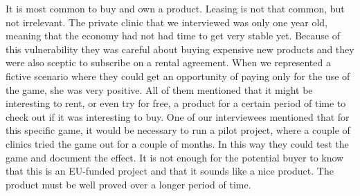 It is most common to buy and own a product. Leasing is not that common, but not irrelevant. The private clinic that we interviewed was only one year old, meaning that the economy had not had time to get very stable yet. Because of this vulnerability they was careful about buying expensive new products and they were also sceptic to subscribe on a rental agreement. When we represented a fictive scenario where they could get an opportunity of paying only for the use of the game, she was very positive. All of them mentioned that it might be interesting to rent, or even try for free, a product for a certain period of time to check out if it was interesting to buy.  One of our interviewees mentioned that for this specific game, it would be necessary to run a pilot project, where a couple of clinics tried the game out for a couple of months. In this way they could test the game and document the effect. It is not enough for the potential buyer to know that this is an EU-funded project and that it sounds like a nice product. The product must be well proved over a longer period of time. \\ \\

